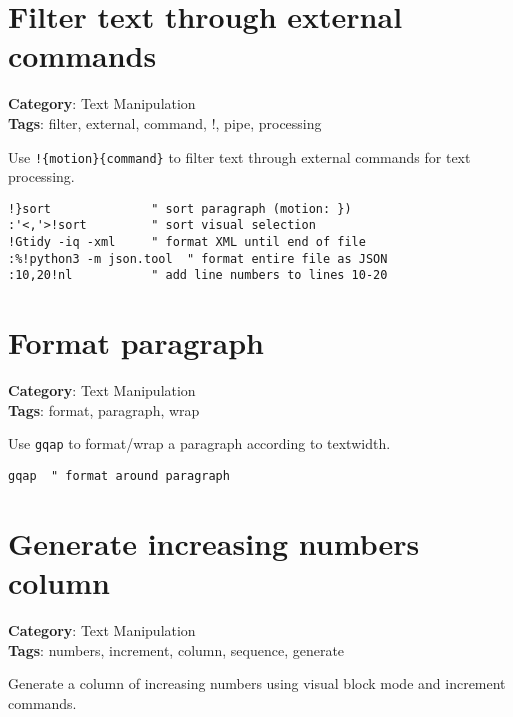 {{{{{{{{{{{{{{\section{Filter text through external commands}

\textbf{Category}: Text Manipulation\\ \textbf{Tags}: filter, external, command, !, pipe, processing
\vspace{0.5cm}

Use {\footnotesize \Verb§!{motion}{command}§} to filter text through external commands for text processing.

\begin{Exa*}{}
\begin{Verbatim}[fontsize=\footnotesize, breaklines, breakanywhere]
!}sort              " sort paragraph (motion: })
:'<,'>!sort         " sort visual selection
!Gtidy -iq -xml     " format XML until end of file
:%!python3 -m json.tool  " format entire file as JSON
:10,20!nl           " add line numbers to lines 10-20
\end{Verbatim}
\end{Exa*}

\section{Format paragraph}

\textbf{Category}: Text Manipulation\\ \textbf{Tags}: format, paragraph, wrap
\vspace{0.5cm}

Use {\footnotesize \Verb§gqap§} to format/wrap a paragraph according to textwidth.

\begin{Exa*}{}
\begin{Verbatim}[fontsize=\footnotesize, breaklines, breakanywhere]
gqap  " format around paragraph
\end{Verbatim}
\end{Exa*}

\section{Generate increasing numbers column}

\textbf{Category}: Text Manipulation\\ \textbf{Tags}: numbers, increment, column, sequence, generate
\vspace{0.5cm}

Generate a column of increasing numbers using visual block mode and increment commands.

}}}}}}}}}}}}}}
